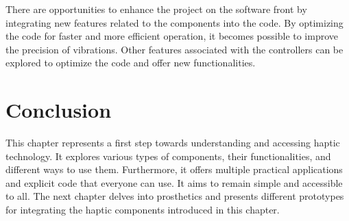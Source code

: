 There are opportunities to enhance the project on the software front by integrating new features related to the components into the code. By optimizing the code for faster and more efficient operation, it becomes possible to improve the precision of vibrations. Other features associated with the controllers can be explored to optimize the code and offer new functionalities.

\section{Conclusion}
This chapter represents a first step towards understanding and accessing haptic technology. It explores various types of components, their functionalities, and different ways to use them. Furthermore, it offers multiple practical applications and explicit code that everyone can use. It aims to remain simple and accessible to all. The next chapter delves into prosthetics and presents different prototypes for integrating the haptic components introduced in this chapter.